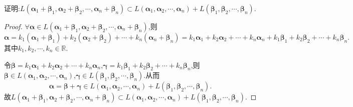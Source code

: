 \documentclass[lang=cn,newtx,10pt,scheme=chinese]{elegantbook}
\begin{document}
\begin{proposition}\label{proposition:和空间包含于空间的和}
证明:$L\left( \boldsymbol{\alpha }_1+\boldsymbol{\beta }_1,\boldsymbol{\alpha }_2+\boldsymbol{\beta }_2,\cdots ,\boldsymbol{\alpha }_n+\boldsymbol{\beta }_n \right) \subset L\left( \boldsymbol{\alpha }_1,\boldsymbol{\alpha }_2,\cdots ,\boldsymbol{\alpha }_n \right) +L\left( \boldsymbol{\beta }_1,\boldsymbol{\beta }_2,\cdots ,\boldsymbol{\beta }_n \right)$.
\end{proposition}
\begin{proof}
$\forall \boldsymbol{\alpha }\in L(\boldsymbol{\alpha }_1+\boldsymbol{\beta }_1,\boldsymbol{\alpha }_2+\boldsymbol{\beta }_2,\cdots,\boldsymbol{\alpha }_n+\boldsymbol{\beta }_n)$,则
\[
\boldsymbol{\alpha } = k_1(\boldsymbol{\alpha }_1+\boldsymbol{\beta }_1)+k_2(\boldsymbol{\alpha }_2+\boldsymbol{\beta }_2)+\cdots +k_n(\boldsymbol{\alpha }_n+\boldsymbol{\beta }_n) = k_1\boldsymbol{\alpha }_1 + k_2\boldsymbol{\alpha }_2+\cdots +k_n\boldsymbol{\alpha }_n + k_1\boldsymbol{\beta }_1 + k_2\boldsymbol{\beta }_2+\cdots +k_n\boldsymbol{\beta }_n.
\]
其中$k_1,k_2,\cdots,k_n\in \mathbb{R}$.

令$\boldsymbol{\beta } = k_1\boldsymbol{\alpha }_1 + k_2\boldsymbol{\alpha }_2+\cdots +k_n\boldsymbol{\alpha }_n$,$\boldsymbol{\gamma } = k_1\boldsymbol{\beta }_1 + k_2\boldsymbol{\beta }_2+\cdots +k_n\boldsymbol{\beta }_n$,则$\boldsymbol{\beta }\in L(\boldsymbol{\alpha }_1,\boldsymbol{\alpha }_2,\cdots,\boldsymbol{\alpha }_n)$,$\boldsymbol{\gamma }\in L(\boldsymbol{\beta }_1,\boldsymbol{\beta }_2,\cdots,\boldsymbol{\beta }_n)$.从而
\[
\boldsymbol{\alpha }=\boldsymbol{\beta }+\boldsymbol{\gamma }\in L(\boldsymbol{\alpha }_1,\boldsymbol{\alpha }_2,\cdots,\boldsymbol{\alpha }_n)+L(\boldsymbol{\beta }_1,\boldsymbol{\beta }_2,\cdots,\boldsymbol{\beta }_n).
\]
故$L\left( \boldsymbol{\alpha }_1+\boldsymbol{\beta }_1,\boldsymbol{\alpha }_2+\boldsymbol{\beta }_2,\cdots ,\boldsymbol{\alpha }_n+\boldsymbol{\beta }_n \right) \subset L\left( \boldsymbol{\alpha }_1,\boldsymbol{\alpha }_2,\cdots ,\boldsymbol{\alpha }_n \right) +L\left( \boldsymbol{\beta }_1,\boldsymbol{\beta }_2,\cdots ,\boldsymbol{\beta }_n \right)$.
\end{proof}
\end{document}
